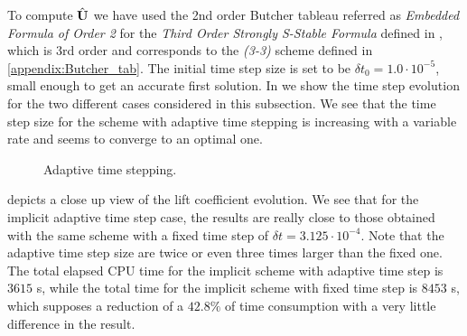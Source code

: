 To compute $\hat{{\bf U}}$ we have used the 2nd order Butcher tableau referred as \textit{Embedded Formula of Order 2} for the \textit{Third Order Strongly S-Stable Formula} defined in \cite{cash_diagonally_1979}, which is 3rd order and
corresponds to the \textit{(3-3)} scheme defined in \ref{appendix:Butcher_tab}. The initial time step size is set to be $\delta t_0=1.0\cdot10^{-5}$, small enough to get an accurate first solution. In  we show the time step evolution for the two different cases considered in this subsection. We see that the time step size for the scheme with adaptive time stepping is increasing with a variable rate and seems to converge to an optimal one. %
\begin{figure}[h!]
  \centering
  \caption{Adaptive time stepping.}
  \label{fig-IMEX_RK_cyl_adp}
\end{figure}
 depicts a close up view of the lift coefficient evolution. We see that for the implicit adaptive time step case, the results are really close to those obtained with the same scheme with a fixed time step of $\delta t=3.125\cdot10^{-4}$. Note that the adaptive time step size are twice or even three times larger than the fixed one. The total elapsed CPU time for the implicit scheme with adaptive time step is $3615$ s, while the total time for the implicit scheme with fixed time step is $8453$ s, which supposes a reduction of a $42.8\%$ of time consumption with a very little difference in the result.

